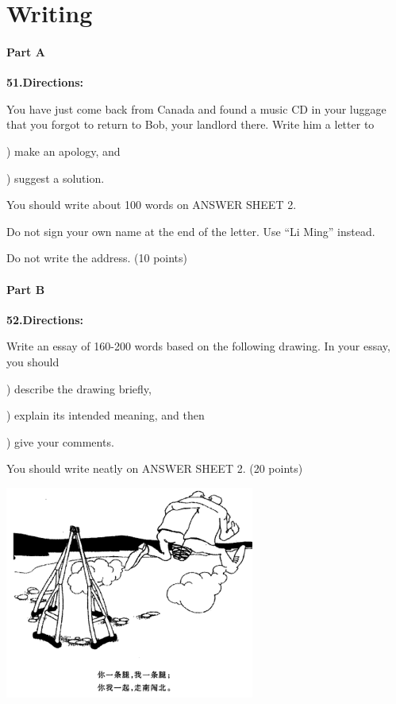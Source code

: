 \section{Writing}
\paragraph{Part A}

\textbf{51.Directions:}

\qquad You have just come back from Canada and found a music CD in your luggage that you forgot to return to Bob, your landlord there. Write him a letter to

) make an apology, and

) suggest a solution.

\qquad You should write about 100 words on ANSWER SHEET 2.

\qquad Do not sign your own name at the end of the letter. Use “Li Ming” instead.

\qquad Do not write the address. (10 points)

\paragraph{Part B}

\textbf{52.Directions:}

\qquad Write an essay of 160-200 words based on the following drawing. In your essay, you should

) describe the drawing briefly,

) explain its intended meaning, and then

) give your comments.

\qquad You should write neatly on ANSWER SHEET 2. (20 points)

\begin{center}\includegraphics[height=7cm]{8.png}\end{center}
